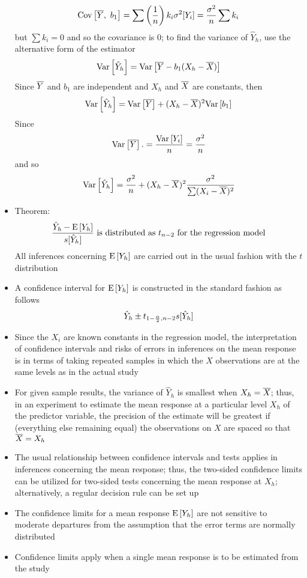 \begin{itemize}
$$ \mathrm{Cov}\left[ \overline{Y},~b_1\right] = \sum \left( \frac{1}{n} \right) k_i \sigma^2[Y_i] = \frac{\sigma^2}{n} \sum k_i $$ but $\sum k_i = 0$ and so the covariance is $0$; to find the variance of $\hat{Y}_h$, use the alternative form of the estimator $$ \mathrm{Var}\left[ \hat{Y}_h \right] = \mathrm{Var}\left[ \overline{Y} - b_1(X_h - \overline{X}) \right] $$ Since $\overline{Y}$ and $b_1$ are independent and $X_h$ and $\overline{X}$ are constants, then $$ \mathrm{Var}\left[ \hat{Y}_h \right] = \mathrm{Var}\left[ \overline{Y} \right] + (X_h - \overline{X})^2\mathrm{Var}\left[ b_1 \right] $$ Since $$ \mathrm{Var}\left[ \overline{Y} \right]. = \frac{\mathrm{Var}\left[ Y_i \right]}{n} = \frac{\sigma^2}{n} $$ and so $$ \mathrm{Var}\left[ \hat{Y}_h \right] = \frac{\sigma^2}{n} + (X_h - \overline{X})^2\frac{\sigma^2}{\sum (X_i  - \overline{X})^2} $$ 
\item Theorem: $$ \frac{\hat{Y}_h - \mathrm{E}\left[ Y_h \right]}{s[\hat{Y}_h]} \text{ is distributed as } t_{n-2} \text{ for the regression model} $$ All inferences concerning $\mathrm{E}\left[ Y_h \right]$ are carried out in the usual fashion with the $t$ distribution
\item A confidence interval for $\mathrm{E}\left[ Y_h \right]$ is constructed in the standard fashion as follows $$ \hat{Y}_h \pm t_{1 - \frac{\alpha}{2}, n-2}s[\hat{Y}_h] $$ 
\item Since the $X_i$ are known constants in the regression model, the interpretation of confidence intervals and risks of errors in inferences on the mean response is in terms of taking repeated samples in which the $X$ observations are at the same levels as in the actual study
\item For given sample results, the variance of $\hat{Y}_h$ is smallest when $X_h = \overline{X}$; thus, in an experiment to estimate the mean response at a particular level $X_h$ of the predictor variable, the precision of the estimate will be greatest if (everything else remaining equal) the observations on $X$ are spaced so that $\overline{X} = X_h$
\item The usual relationship between confidence intervals and tests applies in inferences concerning the mean response; thus, the two-sided confidence limits can be utilized for two-sided tests concerning the mean response at $X_h$; alternatively, a regular decision rule can be set up
\item The confidence limits for a mean response $\mathrm{E}\left[ Y_h \right]$ are not sensitive to moderate departures from the assumption that the error terms are normally distributed 
\item Confidence limits apply when a single mean response is to be estimated from the study
\end{itemize}

